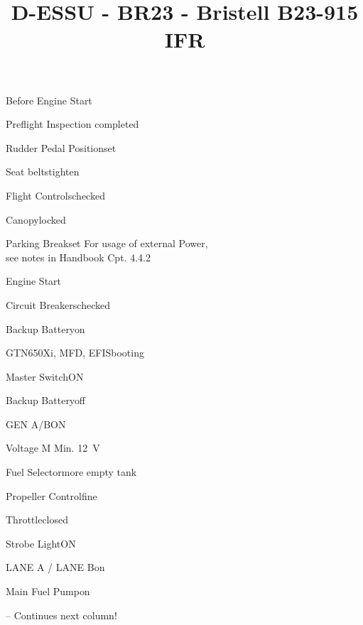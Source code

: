 \def\papersize{5}




\title{D-ESSU  -  BR23  -  Bristell B23-915 IFR}

\begin{checklist}{Before Engine Start}
  \item{Preflight Inspection  }{completed}
  \item{Rudder Pedal Position}{set}
  \item{Seat belts}{tighten}
  \item{Flight Controls}{checked}
  \item{Canopy}{locked}
  \item{Parking Break}{set}
For usage of external Power,\\see notes in Handbook Cpt. 4.4.2
\end{checklist}

\begin{checklist}{Engine Start}
  \item{Circuit Breakers}{checked}
  \item{Backup Battery}{on}
  \item{GTN650Xi, MFD, EFIS}{booting}

  \item{Master Switch}{ON}


  \item{Backup Battery}{off}
  \item{GEN A/B}{ON}
  \item{Voltage M }{Min. 12~V}
  \item{Fuel Selector}{more empty tank}
  \item{Propeller Control}{fine}
  \item{Throttle}{closed}
  \item{Strobe Light}{ON}
  \item{LANE A / LANE B}{on}
  \item{Main Fuel Pump}{on} 

-- Continues next column!
\end{checklist}

